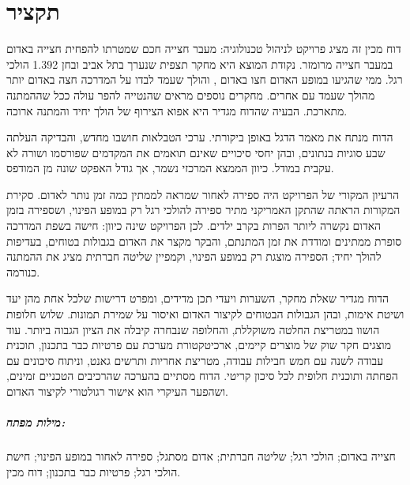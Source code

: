 \chapter*{תקציר}

דוח מכין זה מציג פרויקט לניהול טכנולוגיה: מעבר חצייה חכם שמטרתו להפחית חצייה באדום במעבר חצייה מרומזר.
נקודת המוצא היא מחקר תצפית שנערך בתל אביב ובחן \num{1,392} הולכי רגל. ממי שהגיעו במופע האדום חצו באדום , והולך שעמד לבדו על המדרכה חצה באדום יותר מהולך שעמד עם אחרים.
מחקרים נוספים מראים שהנטייה להפר עולה ככל שההמתנה מתארכת. הבעיה שהדוח מגדיר היא אפוא הצירוף של הולך יחיד והמתנה ארוכה.

הדוח מנתח את מאמר הדגל באופן ביקורתי. ערכי הטבלאות חושבו מחדש, והבדיקה העלתה שבע סוגיות בנתונים, ובהן יחסי סיכויים שאינם תואמים את המקדמים שפורסמו ושורה לא עקבית במודל. כיוון הממצא המרכזי נשמר, אך גודל האפקט שונה מן המודפס.

הרעיון המקורי של הפרויקט היה ספירה לאחור שמראה לממתין כמה זמן נותר לאדום. סקירת המקורות הראתה שהתקן האמריקני מתיר ספירה להולכי רגל רק במופע הפינוי, ושספירה בזמן האדום נקשרה ליותר הפרות בקרב ילדים. לכן הפרויקט שינה כיוון: חישה בשפת המדרכה סופרת ממתינים ומודדת את זמן המתנתם, והבקר מקצר את האדום בגבולות בטוחים, בעדיפות להולך יחיד; הספירה מוצגת רק במופע הפינוי, וקמפיין שליטה חברתית מציג את ההמתנה כנורמה.

הדוח מגדיר שאלת מחקר, השערות ויעדי תכן מדידים, ומפרט דרישות שלכל אחת מהן יעד ושיטת אימות, ובהן הגבולות הבטוחים לקיצור האדום ואיסור על שמירת תמונות. שלוש חלופות הושוו במטריצת החלטה משוקללת, והחלופה שנבחרה קיבלה את הציון הגבוה ביותר. עוד מוצגים חקר שוק של מוצרים קיימים, ארכיטקטורת מערכת עם פרטיות כבר בתכנון, תוכנית עבודה לשנה עם חמש חבילות עבודה, מטריצת אחריות ותרשים גאנט, וניתוח סיכונים עם הפחתה ותוכנית חלופית לכל סיכון קריטי.
הדוח מסתיים בהערכה שהרכיבים הטכניים זמינים, ושהפער העיקרי הוא אישור רגולטורי לקיצור האדום.

\paragraph{מילות מפתח:} חצייה באדום; הולכי רגל; שליטה חברתית; אדום מסתגל; ספירה לאחור במופע הפינוי; חישת הולכי רגל; פרטיות כבר בתכנון; דוח מכין.


